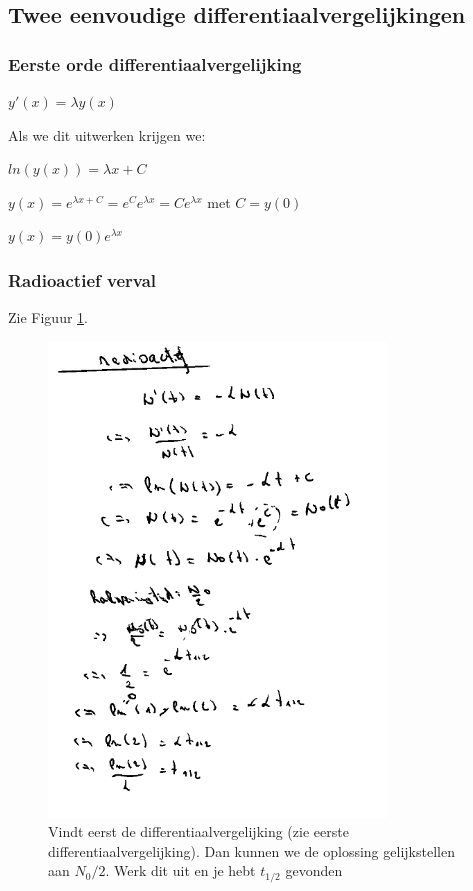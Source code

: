 \documentclass[a4paper]{article}
\begin{document}
\subsection{Twee eenvoudige differentiaalvergelijkingen}

\subsubsection{Eerste orde differentiaalvergelijking}

$y'(x) = \lambda y(x)$

Als we dit uitwerken krijgen we:

$ln(y(x)) = \lambda x + C$

$y(x) = e^{\lambda x + C} = e^C e^{\lambda x} = C e^{\lambda x}$ met $C = y(0)$

$y(x) = y(0) e^{\lambda x}$

\subsubsection*{Radioactief verval}

Zie Figuur \ref{fig:radio_solution}.

\begin{figure}[htbp!]
	\centering
	\includegraphics[width=0.8\textwidth]{assets/radio_solution.png}
	\caption{Vindt eerst de differentiaalvergelijking (zie eerste differentiaalvergelijking). Dan kunnen we de oplossing gelijkstellen aan $N_0 / 2$. Werk dit uit en je hebt $t_{1/2}$ gevonden}
	\label{fig:radio_solution}
\end{figure}
\end{document}
